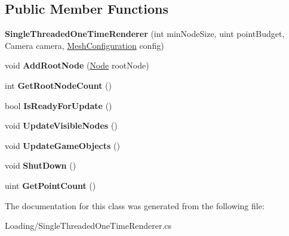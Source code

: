 \subsection*{Public Member Functions}
\begin{DoxyCompactItemize}
\item 
\mbox{\label{class_loading_1_1_single_threaded_one_time_renderer_a7f261d91f4a021ab8318a7f63b8fc990}} 
{\bfseries Single\+Threaded\+One\+Time\+Renderer} (int min\+Node\+Size, uint point\+Budget, Camera camera, \hyperlink{class_object_creation_1_1_mesh_configuration}{Mesh\+Configuration} config)
\item 
\mbox{\label{class_loading_1_1_single_threaded_one_time_renderer_a7d3bdf0ddaa09b3e87191038ee4fd483}} 
void {\bfseries Add\+Root\+Node} (\hyperlink{class_cloud_data_1_1_node}{Node} root\+Node)
\item 
\mbox{\label{class_loading_1_1_single_threaded_one_time_renderer_a89b7b8dd02941271027437efba286ea7}} 
int {\bfseries Get\+Root\+Node\+Count} ()
\item 
\mbox{\label{class_loading_1_1_single_threaded_one_time_renderer_acd280bc98ac2c866c891e369a6eb6d2a}} 
bool {\bfseries Is\+Ready\+For\+Update} ()
\item 
\mbox{\label{class_loading_1_1_single_threaded_one_time_renderer_a6d53bd4a48e64c8755fa2fc394aa17ec}} 
void {\bfseries Update\+Visible\+Nodes} ()
\item 
\mbox{\label{class_loading_1_1_single_threaded_one_time_renderer_a119ad5491373db0ade423c6bd1c05322}} 
void {\bfseries Update\+Game\+Objects} ()
\item 
\mbox{\label{class_loading_1_1_single_threaded_one_time_renderer_a94efd87eec7c2b0e94a8792d6dcbee8c}} 
void {\bfseries Shut\+Down} ()
\item 
\mbox{\label{class_loading_1_1_single_threaded_one_time_renderer_a653406032c57fa5a6bdc759c36694de9}} 
uint {\bfseries Get\+Point\+Count} ()
\end{DoxyCompactItemize}


The documentation for this class was generated from the following file\+:\begin{DoxyCompactItemize}
\item 
Loading/Single\+Threaded\+One\+Time\+Renderer.\+cs\end{DoxyCompactItemize}
